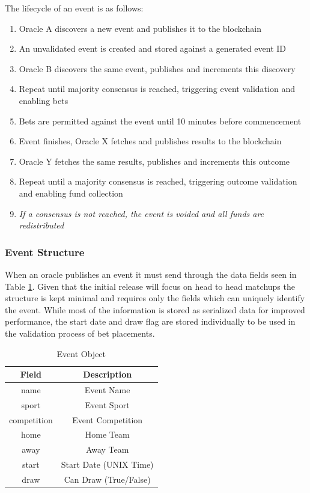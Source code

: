 \documentclass{article}
\begin{document}
The lifecycle of an event is as follows:
\begin{enumerate}
	\item Oracle A discovers a new event and publishes it to the blockchain
	\item An unvalidated event is created and stored against a generated event ID
	\item Oracle B discovers the same event, publishes and increments this discovery
	\item Repeat until majority consensus is reached, triggering event validation and enabling bets
	\item Bets are permitted against the event until 10 minutes before commencement
	\item Event finishes, Oracle X fetches and publishes results to the blockchain
	\item Oracle Y fetches the same results, publishes and increments this outcome
	\item Repeat until a majority consensus is reached, triggering outcome validation and enabling fund collection
	\item \it{If a consensus is not reached, the event is voided and all funds are redistributed}
\end{enumerate}

		\subsubsection{Event Structure} \label{event-structure}
When an oracle publishes an event it must send through the data fields seen in Table \ref{table:events}. Given that the initial release will focus on head to head matchups the structure is kept minimal and requires only the fields which can uniquely identify the event. While most of the information is stored as serialized data for improved performance, the start date and draw flag are stored individually to be used in the validation process of bet placements.

\begin{table}[!htb]
\centering
\caption{Event Object}

\begin{tabular}{ c c }
\bfseries{Field} & \bfseries{Description} \\
\hline

name & Event Name \\
\hline
sport & Event Sport \\
\hline
competition & Event Competition \\
\hline
home & Home Team \\
\hline
away & Away Team \\
\hline
start & Start Date (UNIX Time) \\
\hline
draw & Can Draw (True/False) \\
\hline

\end{tabular}
\label{table:events}
\end{table}
\end{document}
